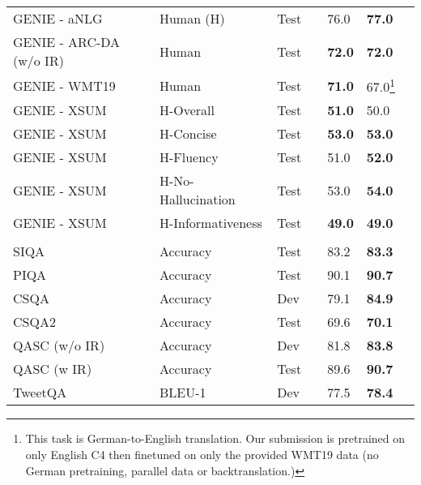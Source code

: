 \documentclass[10pt]{article}
\begin{document}
\begin{center}
\begin{longtable}{lllllll}
   GENIE - aNLG & Human (H) & Test & \citeauthor{genie} & 76.0 & \textbf{77.0}  \\
   GENIE - ARC-DA (w/o IR) & Human & Test & \citeauthor{khashabi2020unifiedqa} & \textbf{72.0} & \textbf{72.0}  \\
   GENIE - WMT19 & Human & Test & \citeauthor{genie} & \textbf{71.0} & 67.0\footnote{This task is German-to-English translation. Our submission is pretrained on only English C4 then finetuned on only the provided WMT19 data (no German pretraining, parallel data or backtranslation.)}  \\
   GENIE - XSUM & H-Overall & Test & \citeauthor{controlprefixes} & \textbf{51.0} & 50.0  \\
   GENIE - XSUM & H-Concise & Test & \citeauthor{controlprefixes} & \textbf{53.0} & \textbf{53.0}  \\  
   GENIE - XSUM & H-Fluency & Test & \citeauthor{controlprefixes} & 51.0 & \textbf{52.0}  \\
   GENIE - XSUM & H-No-Hallucination & Test & \citeauthor{controlprefixes} & 53.0 & \textbf{54.0}  \\
   GENIE - XSUM & H-Informativeness & Test & \citeauthor{controlprefixes} & \textbf{49.0} & \textbf{49.0}  \\
   \\
   
    SIQA & Accuracy & Test & \citeauthor{lourie2021unicorn} & 83.2 &  \textbf{83.3}  \\ 
    PIQA & Accuracy & Test & \citeauthor{lourie2021unicorn}  & 90.1 & \textbf{90.7}\\ 
    CSQA & Accuracy & Dev & \citeauthor{lourie2021unicorn}  & 79.1 & \textbf{84.9} \\ 
    CSQA2 & Accuracy & Test & \citeauthor{lourie2021unicorn} & 69.6 & \textbf{70.1} \\
    QASC (w/o IR) & Accuracy & Dev & \citeauthor{khashabi2020unifiedqa}& 81.8 & \textbf{83.8} \\
    QASC (w IR) & Accuracy & Test & \citeauthor{khashabi2020unifiedqa} & 89.6 & \textbf{90.7} \\ 
    TweetQA & BLEU-1 & Dev & \citeauthor{khashabi2022unifiedqa} & 77.5 & \textbf{78.4} \\
   

\end{longtable}
\end{center}
\end{document}
